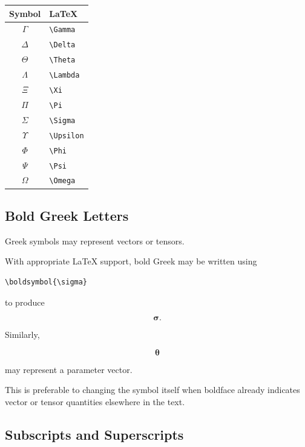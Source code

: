 \begin{center}
\begin{tabular}{c|l}
\textbf{Symbol} & \textbf{LaTeX} \\ \hline
\(\Gamma\) & \verb|\Gamma| \\
\(\Delta\) & \verb|\Delta| \\
\(\Theta\) & \verb|\Theta| \\
\(\Lambda\) & \verb|\Lambda| \\
\(\Xi\) & \verb|\Xi| \\
\(\Pi\) & \verb|\Pi| \\
\(\Sigma\) & \verb|\Sigma| \\
\(\Upsilon\) & \verb|\Upsilon| \\
\(\Phi\) & \verb|\Phi| \\
\(\Psi\) & \verb|\Psi| \\
\(\Omega\) & \verb|\Omega|
\end{tabular}
\end{center}

\subsection{Bold Greek Letters}
\label{subsec:bold-greek-letters}

Greek symbols may represent vectors or tensors.

With appropriate LaTeX support, bold Greek may be written using

\begin{verbatim}
\boldsymbol{\sigma}
\end{verbatim}

to produce

\[
\boxed{
\boldsymbol{\sigma}.
}
\]

Similarly,

\[
\boxed{
\boldsymbol{\theta}
}
\]

may represent a parameter vector.

This is preferable to changing the symbol itself when boldface already
indicates vector or tensor quantities elsewhere in the text.

\subsection{Subscripts and Superscripts}
\label{subsec:greek-subscripts-superscripts}

